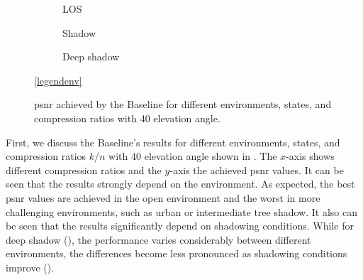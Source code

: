\documentclass[conference]{IEEEtran}
\newcommand\baseline{Baseline\xspace}
\begin{document}
\begin{figure}
  \begin{subfigure}{.32\linewidth}
  \centering
  
  \caption{LOS}
  \label{subfig:baseline_los}
\end{subfigure}
\hfill
\begin{subfigure}{.32\linewidth}
  \centering
  
  \caption{Shadow}
  \label{subfig:baseline_shadow}
\end{subfigure}
\hfill
\begin{subfigure}{.32\linewidth}
  \centering
  
  \caption{Deep shadow}
  \label{subfig:baseline_deep_shadow}
\end{subfigure}

\vspace{1em}
\centering
\ref{legendenv}

\caption{\ac{psnr} achieved by the \baseline for different environments, states, and compression ratios with 40\textdegree{} elevation angle.}
\label{fig:different_scenes_40}
\end{figure}

First, we discuss the \baseline's results for different environments, states, and compression ratios $k/n$ with 40\textdegree{} elevation angle shown in . 
The $x$-axis shows different compression ratios and the $y$-axis the achieved \ac{psnr} values.
It can be seen that the results strongly depend on the environment.
As expected, the best \ac{psnr} values are achieved in the open environment and the worst in more challenging environments, such as urban or intermediate tree shadow.
It also can be seen that the results significantly depend on shadowing conditions. 
While for deep shadow (), the performance varies considerably between different environments, 
the differences become less pronounced as shadowing conditions improve ().
\end{document}
